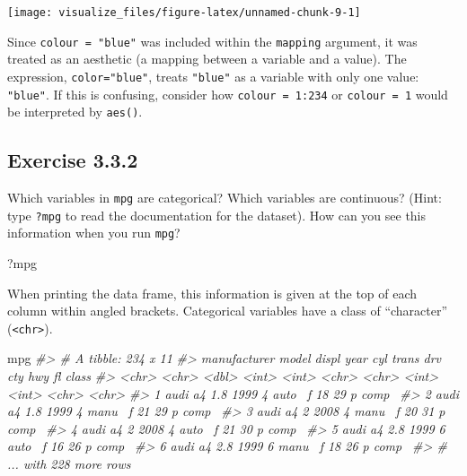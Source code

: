 \documentclass[]{book}
\newenvironment{Shaded}{\begin{snugshade}}{\end{snugshade}}
\newcommand{\CommentTok}[1]{\textcolor[rgb]{0.56,0.35,0.01}{\textit{#1}}}
\newcommand{\NormalTok}[1]{#1}
\theoremstyle{plain}
\theoremstyle{remark}
\theoremstyle{definition}
\theoremstyle{definition}
\theoremstyle{definition}
\theoremstyle{remark}
\begin{document}
\begin{center}\texttt{[image: visualize\_files/figure-latex/unnamed-chunk-9-1]} \end{center}

Since \texttt{colour\ =\ "blue"} was included within the
\texttt{mapping} argument, it was treated as an aesthetic (a mapping
between a variable and a value). The expression, \texttt{color="blue"},
treats \texttt{"blue"} as a variable with only one value:
\texttt{"blue"}. If this is confusing, consider how
\texttt{colour\ =\ 1:234} or \texttt{colour\ =\ 1} would be interpreted
by \texttt{aes()}.

\hypertarget{exercise-3.3.2}{%
\subsection*{\texorpdfstring{Exercise
{3.3.2}}{Exercise 3.3.2}}\label{exercise-3.3.2}}

Which variables in \texttt{mpg} are categorical? Which variables are
continuous? (Hint: type \texttt{?mpg} to read the documentation for the
dataset). How can you see this information when you run \texttt{mpg}?

\begin{Shaded}
\begin{Highlighting}[]
\NormalTok{?mpg}
\end{Highlighting}
\end{Shaded}

When printing the data frame, this information is given at the top of
each column within angled brackets. Categorical variables have a class
of ``character'' (\texttt{\textless{}chr\textgreater{}}).

\begin{Shaded}
\begin{Highlighting}[]
\NormalTok{mpg}
\CommentTok{#> # A tibble: 234 x 11}
\CommentTok{#>   manufacturer model displ  year   cyl trans drv     cty   hwy fl    class}
\CommentTok{#>   <chr>        <chr> <dbl> <int> <int> <chr> <chr> <int> <int> <chr> <chr>}
\CommentTok{#> 1 audi         a4      1.8  1999     4 auto~ f        18    29 p     comp~}
\CommentTok{#> 2 audi         a4      1.8  1999     4 manu~ f        21    29 p     comp~}
\CommentTok{#> 3 audi         a4      2    2008     4 manu~ f        20    31 p     comp~}
\CommentTok{#> 4 audi         a4      2    2008     4 auto~ f        21    30 p     comp~}
\CommentTok{#> 5 audi         a4      2.8  1999     6 auto~ f        16    26 p     comp~}
\CommentTok{#> 6 audi         a4      2.8  1999     6 manu~ f        18    26 p     comp~}
\CommentTok{#> # ... with 228 more rows}
\end{Highlighting}
\end{Shaded}
\end{document}
